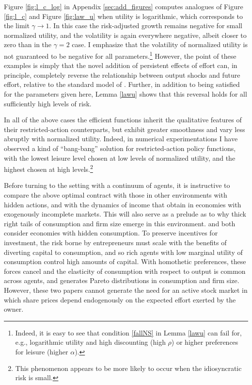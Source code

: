 \documentclass[11pt]{article}
\theoremstyle{plain}
\begin{document}
Figure \ref{fig:l_c_log} in Appendix \ref{sec:add_figures} computes analogues of Figure \ref{fig:l_c} and Figure \ref{fig:law_u} when utility is logarithmic, which corresponds to the limit $\gamma \rightarrow 1$. In this case the risk-adjusted growth remains negative for small normalized utility, and the volatility is again everywhere negative, albeit closer to zero than in the $\gamma=2$ case. I emphasize that the volatility of normalized utility is not guaranteed to be negative for all parameters.\footnote{Indeed, it is easy to see that condition \eqref{fallNS} in Lemma \ref{lawu} can fail for, e.g., logarithmic utility and high discounting (high $\rho$) or higher preferences for leisure (higher $\alpha$).} However, the point of these examples is simply that the novel addition of persistent effects of effort can, in principle, completely reverse the relationship between output shocks and future effort, relative to the standard model of \cite{sannikov_continuous-time_2008}. Further, in addition to being satisfied for the parameters given here, Lemma \ref{lawu} shows that this reversal holds for all sufficiently high levels of risk. 


In all of the above cases the efficient functions inherit the qualitative features of their restricted-action counterparts, but exhibit greater smoothness and vary less abruptly with normalized utility. Indeed, in numerical experimentations I have observed a kind of ``bang-bang'' solution for restricted-action policy functions, with the lowest leisure level chosen at low levels of normalized utility, and the highest chosen at high levels.\footnote{This phenomenon appears to be more likely to occur when the idiosyncratic risk is small.}


Before turning to the setting with a continuum of agents, it is instructive to compare the above optimal contract with those in other environments with hidden actions, and with the dynamics of income that obtain in economies with exogenously incomplete markets. This will also serve as a prelude as to why thick right tails of consumption and firm size emerge in this environment. \cite{shourideh_optimal_2013} and \cite{phelan_optimality_2022} both consider economies with hidden consumption. To preserve incentives for investment, the risk borne by entrepreneurs must scale with the benefits of diverting capital to consumption, and so rich agents with low marginal utility of consumption control high amounts of capital. With homothetic preferences, these forces cancel and the elasticity of consumption with respect to output is common across agents, and generates Pareto distributions in consumption and firm size. However, these two papers cannot generate the need for an active stock market in which share prices depend endogenously on the expected effort exerted by the owner.
\end{document}
